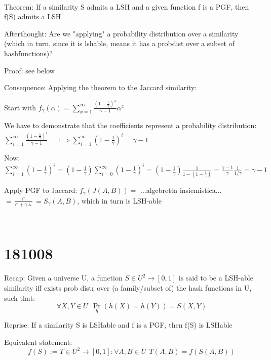 \documentclass{report}
\begin{document}
	\
	
	Theorem: If a similarity S admits a LSH and a given function f is a PGF, then f(S) admits a LSH
	
	Afterthought: Are we "applying" a probability distribution over a similarity (which in turn, since it is lshable, means it has a probdist over a subset of hashfunctions)?
	
	Proof: see below
	
	Consequence: Applying the theorem to the Jaccard similarity:
	
	
	Start with $\displaystyle f_\gamma(\alpha) = \sum_{x=1}^{\infty}\frac{(1-\frac{1}{\gamma})^x}{\gamma -1}\alpha^x$
	
	We have to demonstrate that the coefficients represent a probability distribution: $\displaystyle \sum_{i=1}^{\infty}\frac{(1-\frac{1}{\gamma})^i}{\gamma -1}=1 \Rightarrow \sum_{i=1}^{\infty}(1-\frac{1}{\gamma})^i=\gamma -1$
	
	Now: $\displaystyle \sum_{i=1}^{\infty}(1 - \frac{1}{\gamma})^i = (1 - \frac{1}{\gamma})\sum_{i=0}^{\infty}(1 - \frac{1}{\gamma})^i = (1 - \frac{1}{\gamma}) \frac{1}{1 - (1 - \frac{1}{\gamma})} = \frac{\gamma -1 }{\gamma}\frac{1}{1/\gamma} = \gamma -1$
	
	
	Apply PGF to Jaccard: $f_\gamma (J(A, B)) = $ ...algebretta insiemistica... $= \frac{\cap}{\cap + \gamma\vartriangle} = S_\gamma(A, B)$, which in turn is LSH-able
	
	
	\
	
	\section{181008}
	
	
	
	Recap: Given a universe U, a function $S \in U^2 \to [0, 1]$ is said to be a LSH-able similarity iff exists prob distr over (a family/subset of) the hash functions in U, such that: 
	\begin{equation}
	\forall X, Y \in U\ \ \Pr_h(h(X)=h(Y)) = S(X, Y)
	\end{equation}
	
	
	Reprise: If a similarity S is LSHable and f is a PGF, then f(S) is LSHable
	
	Equivalent statement:
	\begin{equation}
	f(S) := T \in U^2 \to [0, 1] : \forall A, B \in U\ \ T(A, B) = f(S(A, B))
	\end{equation}
	
\end{document}
